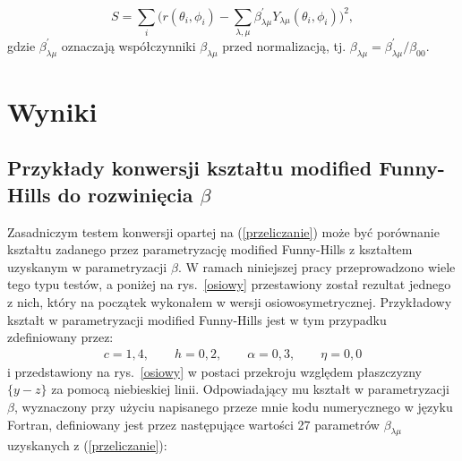 \documentclass[a4paper,polish,twoside]{article}
\numberwithin{equation}{section}
\begin{document}
\begin{equation}
S=\sum \limits_{i} \Big( r(\theta_i, \phi_i) - \sum \limits_{\lambda, \mu} \beta_{\lambda \mu}^{'} Y_{\lambda \mu}(\theta_i, \phi_i) \Big )^2,
\end{equation}
gdzie $\beta_{\lambda \mu}^{'}$ oznaczają współczynniki $\beta_{\lambda \mu}$ przed normalizacją, tj. $\beta_{\lambda \mu}=\beta_{\lambda \mu}^{'}/\beta_{0 0}$. 

\clearpage
\section{Wyniki}

\subsection{Przykłady konwersji kształtu modified Funny-Hills do rozwinięcia $\beta$}

Zasadniczym testem konwersji opartej na (\ref{przeliczanie}) może być porównanie kształtu zadanego przez parametryzację modified Funny-Hills z kształtem uzyskanym w parametryzacji $\beta$. W ramach niniejszej pracy przeprowadzono wiele tego typu testów, a poniżej na rys.~\ref{osiowy} przestawiony został rezultat jednego z nich, który na początek wykonałem w wersji osiowosymetrycznej. Przykładowy kształt w parametryzacji modified Funny-Hills jest w tym przypadku zdefiniowany przez:
\begin{gather*}
c=1,4, \qquad h=0,2, \qquad \alpha=0,3, \qquad \eta=0,0
\end{gather*}
i przedstawiony na rys.~\ref{osiowy} w postaci przekroju względem płaszczyzny $\{y-z\}$ za pomocą niebieskiej linii. Odpowiadający mu kształt w parametryzacji $\beta$, wyznaczony przy użyciu napisanego przeze mnie kodu numerycznego w języku Fortran, definiowany jest przez następujące wartości 27 parametrów $\beta_{\lambda \mu}$ uzyskanych z (\ref{przeliczanie}):
\end{document}
